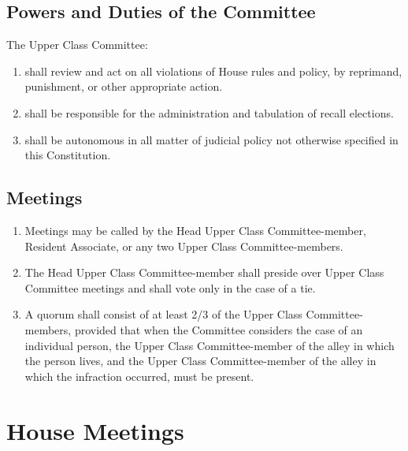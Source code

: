 \documentclass[10pt]{article} %
\begin{document}
\subsection{Powers and Duties of the Committee}
The Upper Class Committee:
\begin{enumerate}
\item shall review and act on all violations of House rules and policy, by reprimand, punishment, or other appropriate action.
\item shall be responsible for the administration and tabulation of recall elections.
\item shall be autonomous in all matter of judicial policy not otherwise specified in this Constitution.
\end{enumerate}
\subsection{Meetings}
\begin{enumerate}
\item Meetings may be called by the Head Upper Class Committee-member, Resident Associate, or any two Upper Class Committee-members.
\item The Head Upper Class Committee-member shall preside over Upper Class Committee meetings and shall vote only in the case of a tie.
\item A quorum shall consist of at least 2/3 of the Upper Class Committee-members, provided that when the Committee considers the case of an individual person, the Upper Class Committee-member of the alley in which the person lives, and the Upper Class Committee-member of the alley in which the infraction occurred, must be present.
\end{enumerate}
\section{House Meetings}
\end{document}
